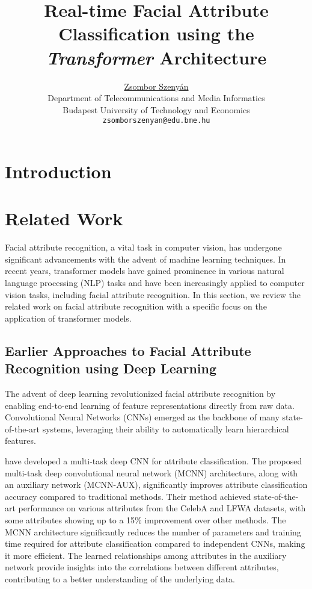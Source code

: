 \documentclass{article}
\title{Real-time Facial Attribute Classification using the \emph{Transformer} Architecture}
\author{ \href{www.linkedin.com/in/zsomborszenyan}{\hspace{1mm}Zsombor Szenyán} \\
  Department of Telecommunications and Media Informatics\\
	Budapest University of Technology and Economics\\
	\texttt{zsomborszenyan@edu.bme.hu} \\
}
\begin{document}
\maketitle

\begin{abstract}
	\lipsum[1]
\end{abstract}




\section{Introduction}
\lipsum[2]
\lipsum[3]

\section{Related Work}
Facial attribute recognition, a vital task in computer vision, has undergone significant advancements with the advent of machine learning techniques. In recent years, transformer models have gained prominence in various natural language processing (NLP) tasks and have been increasingly applied to computer vision tasks, including facial attribute recognition. In this section, we review the related work on facial attribute recognition with a specific focus on the application of transformer models.
\subsection{Earlier Approaches to Facial Attribute Recognition using Deep Learning}
The advent of deep learning revolutionized facial attribute recognition by enabling end-to-end learning of feature representations directly from raw data. Convolutional Neural Networks (CNNs) emerged as the backbone of many state-of-the-art systems, leveraging their ability to automatically learn hierarchical features.

\citet{DBLP:journals/corr/HandC16} have developed a multi-task deep CNN for attribute classification.
The proposed multi-task deep convolutional neural network (MCNN) architecture, along with an auxiliary network (MCNN-AUX), significantly improves attribute classification accuracy compared to traditional methods.
Their method achieved state-of-the-art performance on various attributes from the CelebA and LFWA datasets, with some attributes showing up to a 15\% improvement over other methods.
The MCNN architecture significantly reduces the number of parameters and training time required for attribute classification compared to independent CNNs, making it more efficient.
The learned relationships among attributes in the auxiliary network provide insights into the correlations between different attributes, contributing to a better understanding of the underlying data.
\end{document}
